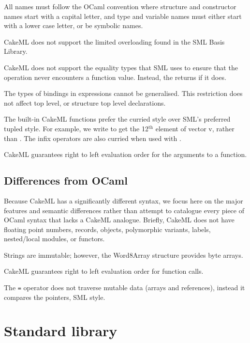 \documentclass[12pt,a4paper]{book}
\begin{document}
All names must follow the OCaml convention where structure and constructor names start with a capital letter, and type and variable names must either start with a lower case letter, or be symbolic names.

CakeML does not support the limited overloading found in the SML Basis Library.

CakeML does not support the equality types that SML uses to ensure that the \smlinline{=} operation never encounters a function value. Instead, the \smlinline{=} returns  if it does.

The types of bindings in  expressions cannot be generalised. This restriction does not affect top level, or structure top level declarations.

The built-in CakeML functions prefer the curried style over SML's preferred tupled style. For example, we write  to get the 12$^\textrm{th}$ element of vector v, rather than . The infix operators are also curried when used with .

CakeML guarantees right to left evaluation order for the arguments to a function.

\section{Differences from OCaml}

Because CakeML has a significantly different syntax, we focus here on the major features and semantic differences rather than attempt to catalogue every piece of OCaml syntax that lacks a CakeML analogue. Briefly, CakeML does not have floating point numbers, records, objects, polymorphic variants, labels, nested/local modules, or functors.

Strings are immutable; however, the Word8Array structure provides byte arrays.

CakeML guarantees right to left evaluation order for function calls.

The \texttt{=} operator does not traverse mutable data (arrays and references), instead it compares the pointers, SML style.

\chapter{Standard library}
\label{ch:stdlib}

\end{document}
